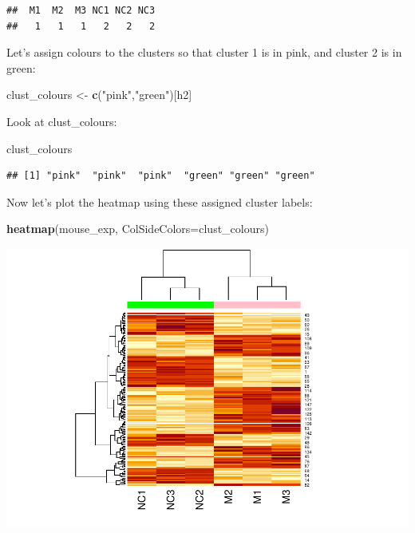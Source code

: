 \documentclass[
]{book}
\newenvironment{Shaded}{\begin{snugshade}}{\end{snugshade}}
\newcommand{\AttributeTok}[1]{\textcolor[rgb]{0.13,0.29,0.53}{#1}}
\newcommand{\FunctionTok}[1]{\textcolor[rgb]{0.13,0.29,0.53}{\textbf{#1}}}
\newcommand{\NormalTok}[1]{#1}
\newcommand{\OtherTok}[1]{\textcolor[rgb]{0.56,0.35,0.01}{#1}}
\newcommand{\StringTok}[1]{\textcolor[rgb]{0.31,0.60,0.02}{#1}}
\begin{document}
\begin{verbatim}
##  M1  M2  M3 NC1 NC2 NC3 
##   1   1   1   2   2   2
\end{verbatim}

Let's assign colours to the clusters so that cluster 1 is in pink, and cluster 2 is in green:

\begin{Shaded}
\begin{Highlighting}[]
\NormalTok{clust\_colours }\OtherTok{\textless{}{-}} \FunctionTok{c}\NormalTok{(}\StringTok{"pink"}\NormalTok{,}\StringTok{"green"}\NormalTok{)[h2]}
\end{Highlighting}
\end{Shaded}

Look at clust\_colours:

\begin{Shaded}
\begin{Highlighting}[]
\NormalTok{clust\_colours}
\end{Highlighting}
\end{Shaded}

\begin{verbatim}
## [1] "pink"  "pink"  "pink"  "green" "green" "green"
\end{verbatim}

Now let's plot the heatmap using these assigned cluster labels:

\begin{Shaded}
\begin{Highlighting}[]
\FunctionTok{heatmap}\NormalTok{(mouse\_exp,}
    \AttributeTok{ColSideColors=}\NormalTok{clust\_colours)}
\end{Highlighting}
\end{Shaded}

\includegraphics{_main_files/figure-latex/unnamed-chunk-18-1.pdf}
\end{document}
